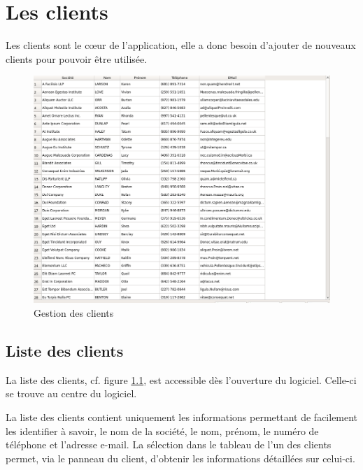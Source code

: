 \chapter{Les clients}
Les clients sont le cœur de l'application, elle a donc besoin d'ajouter de nouveaux clients pour pouvoir être utilisée. 
\begin{figure}[H]
	\centering
	\includegraphics[width=12cm]{screens/clients.png}
	\caption{Gestion des clients}
	\label{fig:gestionClients}
\end{figure}

\section{Liste des clients}
La liste des clients, cf. figure \ref{fig:gestionClients}, est accessible dès l’ouverture du logiciel. Celle-ci se trouve au centre du logiciel. 

La liste des clients contient uniquement les informations permettant de facilement les identifier à savoir, le nom de la société, le nom,
prénom, le numéro de téléphone et l’adresse e-mail. La sélection dans le tableau de l’un des clients permet, via le panneau du client,
d’obtenir les informations détaillées sur celui-ci. 

